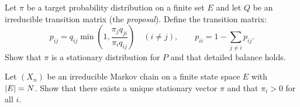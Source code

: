 \begin{exercise}
Let $\pi$ be a target probability distribution on a finite set $E$ and let $Q$ be an
irreducible transition matrix (the \emph{proposal}). Define the transition matrix:
\[
    p_{ij} = q_{ij} \min\!\left(1, \frac{\pi_j q_{ji}}{\pi_i q_{ij}}\right)
    \quad (i \neq j), \qquad
    p_{ii} = 1 - \sum_{j \neq i} p_{ij}.
\]
Show that $\pi$ is a stationary distribution for $P$ and that detailed balance holds.
\end{exercise}

\begin{exercise}
Let $(X_n)$ be an irreducible Markov chain on a finite state space $E$ with
$\left| E \right| = N$. Show that there exists a unique stationary vector $\pi$ and that
$\pi_i > 0$ for all $i$.
\end{exercise}
